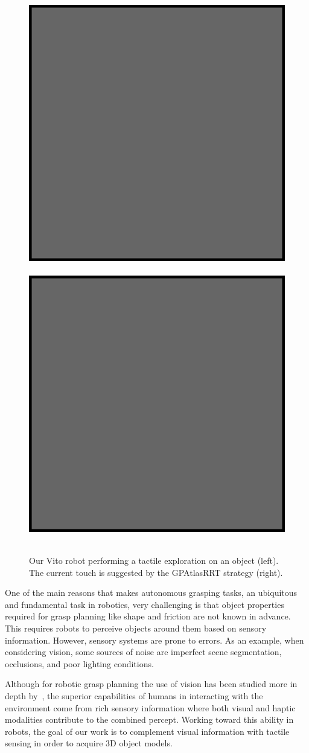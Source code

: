 
\begin{figure}
\centering
\mbox{
  \includegraphics[width=0.5\linewidth]{box.eps}
  \includegraphics[width=0.5\linewidth]{box.eps}
}
\caption{Our Vito robot performing a tactile exploration on an object (left). The current touch is suggested by the GPAtlasRRT strategy (right).}
\label{fig:setup_solution}
\end{figure}

One of the main reasons that makes autonomous grasping tasks, an ubiquitous and fundamental task in robotics, very challenging is that object properties required for grasp planning like shape and friction are not known %
in advance.
This requires robots to perceive objects around them based on sensory information. However, sensory systems are prone to errors. As an example, when considering vision, some sources of noise are imperfect scene segmentation, occlusions, and poor lighting conditions.

Although for robotic grasp planning the use of vision has been studied more in depth by~\cite{Kragic2002TechRep}, the superior capabilities of humans in interacting with the environment come from rich sensory information where both visual and haptic modalities contribute to the combined percept. Working toward this ability in robots, the goal of our work is to complement visual information with tactile sensing in order to acquire 3D object models.

